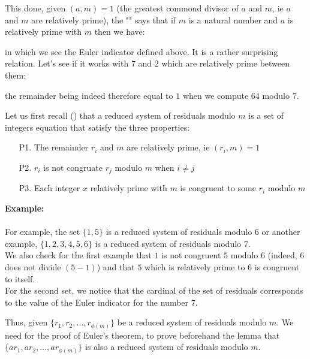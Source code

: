 	\begin{theorem}
	This done, given $(a,m)=1$ (the greatest commond divisor of $a$ and $m$, ie $a$ and $m$ are relatively prime), the "" says that if $m$ is a natural number and $a$ is relatively prime with $m$ then we have:
	
	in which we see the Euler indicator defined above. It is a rather surprising relation. Let's see if it works with $7$ and $2$ which are relatively prime between them:
	
	the remainder being indeed therefore equal to $1$ when we compute $64$ modulo $7$.
	\end{theorem}
	\begin{dem}
	Let us first recall () that a reduced system of residuals modulo $m$ is a set of integers equation that satisfy the three properties:
	\begin{enumerate}
		\item[P1.] The remainder $r_i$ and $m$ are relatively prime, ie $(r_i,m)=1$

		\item[P2.] $r_i$ is not congruate $r_j$ modulo $m$ when $i\neq j$

		\item[P3.] Each integer $x$ relatively prime with $m$ is congruent to some $r_i$ modulo $m$
	\end{enumerate}
	\begin{tcolorbox}[colframe=black,colback=white,sharp corners]
	\textbf{{\Large {}}Example:}\\\\
	For example, the set $\{1,5\}$ is a reduced system of residuals modulo $6$ or another example, $\{1,2,3,4,5,6\}$ is a reduced system of residuals modulo $7$. \\

	We also check for the first example that $1$ is not congruent $5$ modulo $6$ (indeed, $6$ does not divide $(5-1)$) and that $5$ which is relatively prime to $6$ is congruent to itself.\\

	For the second set, we notice that the cardinal of the set of residuals corresponds to the value of the Euler indicator for the number $7$.
	\end{tcolorbox}
	\begin{lemma}
	Thus, given $\{r_1,r_2,\ldots,r_{\phi(m)}\}$ be a reduced system of residuals modulo $m$. We need for the proof of Euler's theorem, to prove beforehand the lemma that $\{ar_1,ar_2,\ldots,ar_{\phi(m)}\}$ is also a reduced system of residuals modulo $m$.
	\end{lemma}
	

\end{dem}
